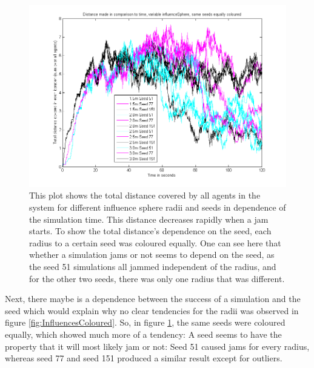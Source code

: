 \begin{figure}[h!]
	\centering
		\includegraphics[width=1.00\textwidth]{pictures/ATotalDistanceSeedsColoured.png}
	\caption{This plot shows the total distance covered by all agents in the system for different influence sphere radii and seeds in dependence of the simulation time. This distance decreases rapidly when a jam starts. To show the total distance's dependence on the seed, each radius to a certain seed was coloured equally. One can see here that whether a simulation jams or not seems to depend on the seed, as the seed 51 simulations all jammed independent of the radius, and for the other two seeds, there was only one radius that was different.}
	\label{fig:SeedsColoured}
\end{figure}

\noi Next, there maybe is a dependence between the success of a simulation and the seed which would explain why no clear tendencies for the radii was observed in figure \ref{fig:InfluencesColoured}. So, in figure \ref{fig:SeedsColoured}, the same seeds were coloured equally, which showed much more of a tendency: A seed seems to have the property that it will most likely jam or not: Seed 51 caused jams for every radius, whereas seed 77 and seed 151 produced a similar result except for outliers.

